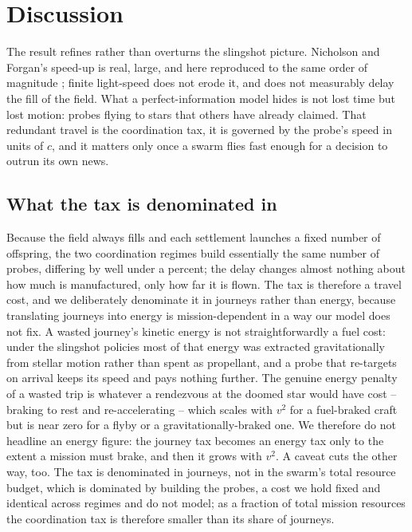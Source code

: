 \section{Discussion}

The result refines rather than overturns the slingshot picture.
Nicholson and Forgan's speed-up is real, large, and here reproduced to the same order of magnitude
\citep{nicholson-forgan-2013}; finite light-speed does not erode it, and does not measurably
delay the fill of the field. What a perfect-information model hides is not lost time but lost
motion: probes flying to stars that others have already claimed. That redundant travel is the
coordination tax, it is governed by the probe's speed in units of $c$, and it matters only once
a swarm flies fast enough for a decision to outrun its own news.

\subsection{What the tax is denominated in}
Because the field always fills and each settlement launches a fixed number of offspring, the two
coordination regimes build essentially the same number of probes, differing by well under a
percent; the delay changes almost nothing about how much is manufactured, only how far it is
flown. The tax is therefore a travel cost, and we deliberately denominate it in journeys rather
than energy, because translating journeys into energy is mission-dependent in a way our model does
not fix. A wasted journey's kinetic energy is not straightforwardly a fuel cost: under the
slingshot policies most of that energy was extracted gravitationally from stellar motion rather
than spent as propellant, and a probe that re-targets on arrival keeps its speed and pays nothing
further. The genuine energy penalty of a wasted trip is whatever a rendezvous at the doomed star
would have cost -- braking to rest and re-accelerating -- which scales with $v^2$ for a fuel-braked
craft but is near zero for a flyby or a gravitationally-braked one. We therefore do not headline an
energy figure: the journey tax becomes an energy tax only to the extent a mission must brake, and
then it grows with $v^2$. A caveat cuts the other way, too. The tax is denominated in journeys, not
in the swarm's total resource budget, which is dominated by building the probes, a cost we hold
fixed and identical across regimes and do not model; as a fraction of total mission resources the
coordination tax is therefore smaller than its share of journeys.

